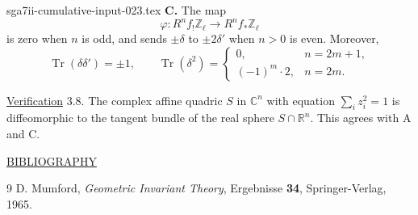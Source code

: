 \begin{filecontents*}{sga7ii-cumulative-input-023.tex}
\medskip
\noindent\textbf{C.} The map
\begin{equation*}
\varphi:R^nf_!\mathbb Z_\ell\longrightarrow R^nf_*\mathbb Z_\ell
\end{equation*}
is zero when $n$ is odd, and sends $\pm\delta$ to $\pm2\delta'$ when
$n>0$ is even.  Moreover,
\begin{equation*}
\operatorname{Tr}(\delta\delta')=\pm1,
\qquad
\operatorname{Tr}(\delta^2)=
\begin{cases}
0, & n=2m+1,\\
(-1)^m\cdot2, & n=2m.
\end{cases}
\end{equation*}

\underline{Verification} 3.8. The complex affine quadric $S$ in
$\mathbb C^n$ with equation $\sum_i z_i^2=1$ is diffeomorphic to the
tangent bundle of the real sphere $S\cap\mathbb R^n$.  This agrees with
A and C.

\medskip
\underline{BIBLIOGRAPHY}

\begin{thebibliography}{9}
D. Mumford, \emph{Geometric Invariant Theory}, Ergebnisse \textbf{34},
Springer-Verlag, 1965.
\end{thebibliography}
\end{filecontents*}
